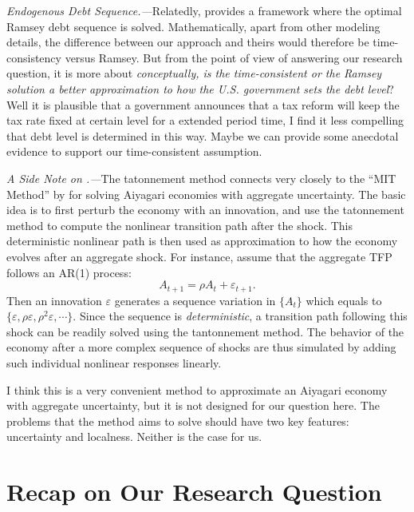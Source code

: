 \documentclass[twoside,11pt,leqno]{article}
\begin{document}
\textit{Endogenous Debt Sequence.---}Relatedly, \citet{Acikgozetal:2018} provides a framework where the optimal Ramsey debt sequence is solved. Mathematically, apart from other modeling details, the difference between our approach and theirs would therefore be time-consistency versus Ramsey. But from the point of view of answering our research question, it is more about \textit{conceptually, is the time-consistent or the Ramsey solution a better approximation to how the U.S. government sets the debt level}? Well it is plausible that a government announces that a tax reform will keep the tax rate fixed at certain level for a extended period time, I find it less compelling that debt level is determined in this way. Maybe we can provide some anecdotal evidence to support our time-consistent assumption.

\textit{A Side Note on \citet{Boppartetal:2018}.---}The tatonnement method connects very closely to the ``MIT Method'' by \citet{Boppartetal:2018} for solving Aiyagari economies with aggregate uncertainty. The basic idea is to first perturb the economy with an innovation, and use the tatonnement method to compute the nonlinear transition path after the shock. This deterministic nonlinear path is then used as approximation to how the economy evolves after an aggregate shock. For instance, assume that the aggregate TFP follows an AR(1) process:
\begin{equation*}
    A_{t+1} = \rho A_t + \varepsilon_{t+1}.
\end{equation*}
Then an innovation $\varepsilon$ generates a sequence variation in $\{A_t\}$ which equals to $\{\varepsilon, \rho \varepsilon, \rho^2 \varepsilon, \cdots\}$. Since the sequence is \textit{deterministic}, a transition path following this shock can be readily solved using the tantonnement method. The behavior of the economy after a more complex sequence of shocks are thus simulated by adding such individual nonlinear responses linearly.

I think this is a very convenient method to approximate an Aiyagari economy with aggregate uncertainty, but it is not designed for our question here. The problems that the method aims to solve should have two key features: uncertainty and localness. Neither is the case for us.

\section{Recap on Our Research Question}
\end{document}
